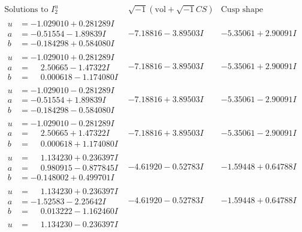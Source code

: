 \documentclass[1p]{elsarticle_modified}
\theoremstyle{definition}
\newcommand{\I}{\sqrt{-1}}
\begin{document}
$$\begin{array}{c|c|c}  
\text{Solutions to }I^u_{2}& \I (\text{vol} + \sqrt{-1}CS) & \text{Cusp shape}\\
 \hline 
\begin{aligned}
u &= -1.029010 + 0.281289 I \\
a &= -0.51554 - 1.89839 I \\
b &= -0.184298 + 0.584080 I\end{aligned}
 & -7.18816 - 3.89503 I & -5.35061 + 2.90091 I \\ \hline\begin{aligned}
u &= -1.029010 + 0.281289 I \\
a &= \phantom{-}2.50665 - 1.47322 I \\
b &= \phantom{-}0.000618 - 1.174080 I\end{aligned}
 & -7.18816 - 3.89503 I & -5.35061 + 2.90091 I \\ \hline\begin{aligned}
u &= -1.029010 - 0.281289 I \\
a &= -0.51554 + 1.89839 I \\
b &= -0.184298 - 0.584080 I\end{aligned}
 & -7.18816 + 3.89503 I & -5.35061 - 2.90091 I \\ \hline\begin{aligned}
u &= -1.029010 - 0.281289 I \\
a &= \phantom{-}2.50665 + 1.47322 I \\
b &= \phantom{-}0.000618 + 1.174080 I\end{aligned}
 & -7.18816 + 3.89503 I & -5.35061 - 2.90091 I \\ \hline\begin{aligned}
u &= \phantom{-}1.134230 + 0.236397 I \\
a &= \phantom{-}0.980915 - 0.877845 I \\
b &= -0.148002 + 0.499701 I\end{aligned}
 & -4.61920 - 0.52783 I & -1.59448 + 0.64788 I \\ \hline\begin{aligned}
u &= \phantom{-}1.134230 + 0.236397 I \\
a &= -1.52583 - 2.25642 I \\
b &= \phantom{-}0.013222 - 1.162460 I\end{aligned}
 & -4.61920 - 0.52783 I & -1.59448 + 0.64788 I \\ \hline\begin{aligned}
u &= \phantom{-}1.134230 - 0.236397 I \\

\end{aligned}
\end{array}$$
\end{document}
